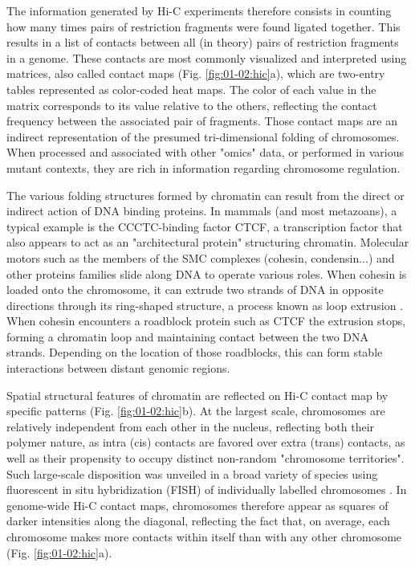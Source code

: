 The information generated by Hi-C experiments therefore consists in counting how many times pairs of restriction fragments were found ligated together. This results in a list of contacts between all (in theory) pairs of restriction fragments in a genome. These contacts are most commonly visualized and interpreted using matrices, also called contact maps (Fig. \ref{fig:01-02:hic}a), which are two-entry tables represented as color-coded heat maps. The color of each value in the matrix corresponds to its value relative to the others, reflecting the contact frequency between the associated pair of fragments. Those contact maps are an indirect representation of the presumed tri-dimensional folding of chromosomes. When processed and associated with other "omics" data, or performed in various mutant contexts, they are rich in information regarding chromosome regulation.

The various folding structures formed by chromatin can result from the direct or indirect action of DNA binding proteins. In mammals (and most metazoans), a typical example is the CCCTC-binding factor \acrfull{CTCF}, a transcription factor that also appears to act as an "architectural protein" structuring chromatin. Molecular motors such as the members of the \acrfull{SMC} complexes (cohesin, condensin...) and other proteins families slide along DNA to operate various roles. When cohesin is loaded onto the chromosome, it can extrude two strands of DNA in opposite directions through its ring-shaped structure, a process known as loop extrusion \cite{fudenbergFormationChromosomalDomains2016}. When cohesin encounters a roadblock protein such as \acrshort{CTCF} the extrusion stops, forming a chromatin loop and maintaining contact between the two DNA strands. Depending on the location of those roadblocks, this can form stable interactions between distant genomic regions.


Spatial structural features of chromatin are reflected on Hi-C contact map by specific patterns (Fig. \ref{fig:01-02:hic}b). At the largest scale, chromosomes are relatively independent from each other in the nucleus, reflecting both their polymer nature, as intra (cis) contacts are favored over extra (trans) contacts, as well as their propensity to occupy distinct non-random "chromosome territories". Such large-scale disposition was unveiled in a broad variety of species using fluorescent in situ hybridization (FISH) of individually labelled chromosomes \cite{therizolsChromosomeArmLength2010,schardinSpecificStainingHuman1985,cremerChromosomeTerritories2010,taddeiStructureFunctionBudding2012}. In genome-wide Hi-C contact maps, chromosomes therefore appear as squares of darker intensities along the diagonal, reflecting the fact that, on average, each chromosome makes more contacts within itself than with any other chromosome (Fig. \ref{fig:01-02:hic}a).

